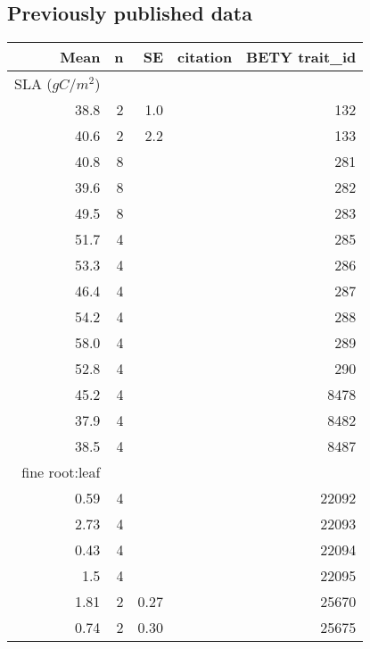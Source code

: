 \documentclass[12pt]{article}
\begin{document}
\begin{flushleft}
\begin{spacing}{1}
\subsection*{Previously published data}
\begin{longtable}{rrrlr}
  \toprule
  Mean & n & SE & citation & BETY trait\_id \\
  \midrule \endhead
  SLA ($g C/ m^2$) & & & & \\*
  \hline
  38.8 &  2 & 1.0 & \citet{knapp1995efd} & 132 \\* 
  40.6 &  2 & 2.2 & \citet{knapp1995efd} & 133 \\* 
  40.8 &  8 &  & \citet{byrd2000pcs} & 281 \\* 
  39.6 &  8 &  & \citet{byrd2000pcs} & 282 \\* 
  49.5 &  8 &  & \citet{byrd2000pcs} & 283 \\* 
  51.7 &  4 &  & \citet{byrd2000pcs} & 285 \\* 
  53.3 &  4 &  & \citet{byrd2000pcs} & 286 \\* 
  46.4 &  4 &  & \citet{byrd2000pcs} & 287 \\* 
  54.2 &  4 &  & \citet{byrd2000pcs} & 288 \\* 
  58.0 &  4 &  & \citet{byrd2000pcs} & 289 \\* 
  52.8 &  4 &  & \citet{byrd2000pcs} & 290 \\* 
  45.2 &  4 &  & \citet{trocsanyi2009ycc} & 8478 \\* 
  37.9 &  4 &  & \citet{trocsanyi2009ycc} & 8482 \\* 
  38.5 &  4 &  & \citet{trocsanyi2009ycc}  & 8487 \\
  \hline
  \hline
  fine root:leaf & & & &  \\*
  \hline
  0.59 &  4 &  & \citet{kiniry1999rue} & 22092 \\* 
  2.73 &  4 &  & \citet{kiniry1999rue} & 22093 \\* 
  0.43 &  4 &  & \citet{kiniry1999rue} & 22094 \\* 
  1.5 &  4 &  & \citet{kiniry1999rue}  & 22095 \\* 
  1.81 &  2 & 0.27 & \citet{tjoelker2005llr} & 25670 \\* 
  0.74 &  2 & 0.30 & \citet{tjoelker2005llr} & 25675 \\
  \hline


\end{longtable}
\end{spacing}
\end{flushleft}
\end{document}
